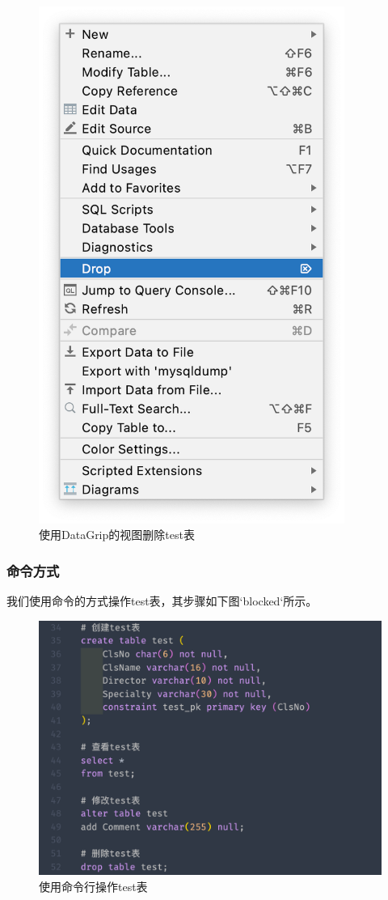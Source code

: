 \documentclass[a4paper,UTF8,heading=false,12pt]{article}
\begin{document}
    \begin{figure}[htbp]
        \centering
        \includegraphics[width=10cm]{../Images/TestTable_OnDrop.png}
        \caption{使用DataGrip的视图删除test表}
    \end{figure}

    \subsubsection{命令方式}

    我们使用命令的方式操作test表，其步骤如下图`blocked`所示。

    \begin{figure}[htbp]
        \centering
        \includegraphics[width=15cm]{../Images/TestTable_WithCommand.png}
        \caption{使用命令行操作test表}
    \end{figure}
\end{document}
